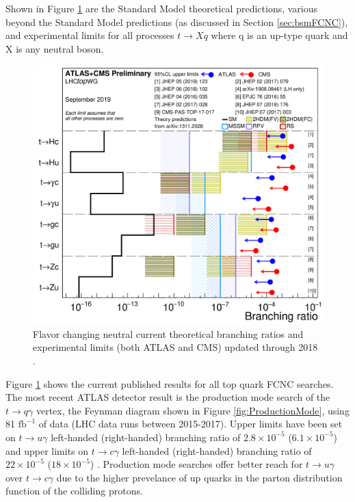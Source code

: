 Shown in Figure \ref{fig:FCNClimits} are the Standard Model theoretical predictions, various beyond the Standard Model predictions (as discussed in Section \ref{sec:bsmFCNC}), and experimental limits for all processes $t\rightarrow Xq$ where q is an up-type quark and X is any neutral boson.  
\begin{figure}[h!]
	\centering
	\includegraphics[width=.8\columnwidth]{../ThesisImages/Theory/AllFCNCLimits.png}
	\caption[Flavor changing neutral current theoretical branching ratios and experimental limits (both ATLAS and CMS) updated through 2018. ]{Flavor changing neutral current theoretical branching ratios and experimental limits (both ATLAS and CMS) updated through 2018 \cite{TopWG}. }
	\label{fig:FCNClimits}
\end{figure}


Figure \ref{fig:FCNClimits} shows the current published results for all top quark FCNC searches.  The most recent ATLAS detector result is the production mode search of the $t\rightarrow q\gamma$ vertex, the Feynman diagram shown in Figure \ref{fig:ProductionMode}, using 81 $\text{fb}^{-1}$ of data (LHC data runs between 2015-2017).  Upper limits have been set on $t\rightarrow u \gamma$ left-handed (right-handed) branching ratio of $2.8\times 10^{-5}$ ($6.1\times 10^{-5}$) and upper limits on $t \rightarrow c \gamma$ left-handed (right-handed) branching ratio of $22\times10^{-5}$ ($18\times10^{-5}$) \cite{GregorFCNC}.  Production mode searches offer better reach for $t\rightarrow u \gamma$ over $t\rightarrow c \gamma$ due to the higher prevelance of up quarks in the parton distribution function of the colliding protons.

